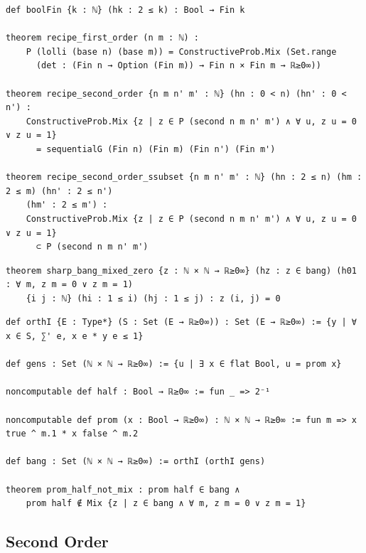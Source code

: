 \label{lean:recipe-formula}
\begin{lstlisting}
def boolFin {k : ℕ} (hk : 2 ≤ k) : Bool → Fin k

theorem recipe_first_order (n m : ℕ) :
    P (lolli (base n) (base m)) = ConstructiveProb.Mix (Set.range
      (det : (Fin n → Option (Fin m)) → Fin n × Fin m → ℝ≥0∞))

theorem recipe_second_order {n m n' m' : ℕ} (hn : 0 < n) (hn' : 0 < n') :
    ConstructiveProb.Mix {z | z ∈ P (second n m n' m') ∧ ∀ u, z u = 0 ∨ z u = 1}
      = sequentialG (Fin n) (Fin m) (Fin n') (Fin m')

theorem recipe_second_order_ssubset {n m n' m' : ℕ} (hn : 2 ≤ n) (hm : 2 ≤ m) (hn' : 2 ≤ n')
    (hm' : 2 ≤ m') :
    ConstructiveProb.Mix {z | z ∈ P (second n m n' m') ∧ ∀ u, z u = 0 ∨ z u = 1}
      ⊂ P (second n m n' m')
\end{lstlisting}

\label{lean:sharp-bang-mixed-zero}
\begin{lstlisting}
theorem sharp_bang_mixed_zero {z : ℕ × ℕ → ℝ≥0∞} (hz : z ∈ bang) (h01 : ∀ m, z m = 0 ∨ z m = 1)
    {i j : ℕ} (hi : 1 ≤ i) (hj : 1 ≤ j) : z (i, j) = 0
\end{lstlisting}

\label{lean:prom-half-not-mix}
\begin{lstlisting}
def orthI {E : Type*} (S : Set (E → ℝ≥0∞)) : Set (E → ℝ≥0∞) := {y | ∀ x ∈ S, ∑' e, x e * y e ≤ 1}

def gens : Set (ℕ × ℕ → ℝ≥0∞) := {u | ∃ x ∈ flat Bool, u = prom x}

noncomputable def half : Bool → ℝ≥0∞ := fun _ => 2⁻¹

noncomputable def prom (x : Bool → ℝ≥0∞) : ℕ × ℕ → ℝ≥0∞ := fun m => x true ^ m.1 * x false ^ m.2

def bang : Set (ℕ × ℕ → ℝ≥0∞) := orthI (orthI gens)

theorem prom_half_not_mix : prom half ∈ bang ∧
    prom half ∉ Mix {z | z ∈ bang ∧ ∀ m, z m = 0 ∨ z m = 1}
\end{lstlisting}

\subsection{Second Order}

